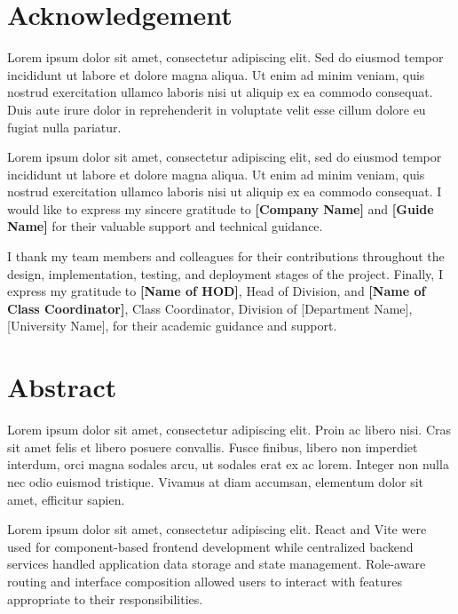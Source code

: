 \documentclass[12pt,a4paper,oneside]{report}
\begin{document}
\clearpage
\chapter*{Acknowledgement}

Lorem ipsum dolor sit amet, consectetur adipiscing elit. Sed do eiusmod tempor incididunt ut labore et dolore magna aliqua. Ut enim ad minim veniam, quis nostrud exercitation ullamco laboris nisi ut aliquip ex ea commodo consequat. Duis aute irure dolor in reprehenderit in voluptate velit esse cillum dolore eu fugiat nulla pariatur.

Lorem ipsum dolor sit amet, consectetur adipiscing elit, sed do eiusmod tempor incididunt ut labore et dolore magna aliqua. Ut enim ad minim veniam, quis nostrud exercitation ullamco laboris nisi ut aliquip ex ea commodo consequat. I would like to express my sincere gratitude to \textbf{[Company Name]} and \textbf{[Guide Name]} for their valuable support and technical guidance.

I thank my team members and colleagues for their contributions throughout the design, implementation, testing, and deployment stages of the project. Finally, I express my gratitude to \textbf{[Name of HOD]}, Head of Division, and \textbf{[Name of Class Coordinator]}, Class Coordinator, Division of [Department Name], [University Name], for their academic guidance and support.

\clearpage
\chapter*{Abstract}

Lorem ipsum dolor sit amet, consectetur adipiscing elit. Proin ac libero nisi. Cras sit amet felis et libero posuere convallis. Fusce finibus, libero non imperdiet interdum, orci magna sodales arcu, ut sodales erat ex ac lorem. Integer non nulla nec odio euismod tristique. Vivamus at diam accumsan, elementum dolor sit amet, efficitur sapien.

Lorem ipsum dolor sit amet, consectetur adipiscing elit. React and Vite were used for component-based frontend development while centralized backend services handled application data storage and state management. Role-aware routing and interface composition allowed users to interact with features appropriate to their responsibilities.
\end{document}
